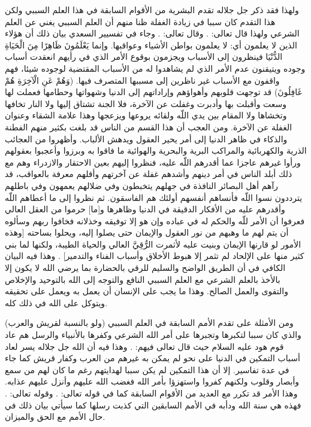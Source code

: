 ولهذا فقد ذكر جل جلاله تقدم البشرية من الأقوام السابقة في هذا العلم السببي ولكن هذا التقدم كان سببا في زيادة الغفلة ظنا منهم أن العلم السببي يغني عن العلم الشرعي ولهذا قال تعالى: 
\quranayah*[40][83]{\footnotesize \surahname*[40]}. وقال تعالى:
\quranayah*[30][7]{\footnotesize \surahname*[30]}. وجاء في تفسيير السعدي بيان ذلك أن هؤلاء الذين لا يعلمون أي: لا يعلمون بواطن الأشياء وعواقبها. وإنما {يَعْلَمُونَ ظَاهِرًا مِنَ الْحَيَاةِ الدُّنْيَا} فينظرون إلى الأسباب ويجزمون بوقوع الأمر الذي في رأيهم انعقدت أسباب وجوده ويتيقنون عدم الأمر الذي لم يشاهدوا له من الأسباب المقتضية لوجوده شيئا، فهم واقفون مع الأسباب غير ناظرين إلى مسببها المتصرف فيها. (وَهُمْ عَنِ الْآخِرَةِ هُمْ غَافِلُونَ) قد توجهت قلوبهم وأهواؤهم وإراداتهم إلى الدنيا وشهواتها وحطامها فعملت لها وسعت وأقبلت بها وأدبرت وغفلت عن الآخرة، فلا الجنة تشتاق إليها ولا النار تخافها وتخشاها ولا المقام بين يدي اللّه ولقائه يروعها ويزعجها وهذا علامة الشقاء وعنوان الغفلة عن الآخرة. ومن العجب أن هذا القسم من الناس قد بلغت بكثير منهم الفطنة والذكاء في ظاهر الدنيا إلى أمر يحير العقول ويدهش الألباب. وأظهروا من العجائب الذرية والكهربائية والمراكب البرية والبحرية والهوائية ما فاقوا به وبرزوا وأعجبوا بعقولهم ورأوا غيرهم عاجزا عما أقدرهم اللّه عليه، فنظروا إليهم بعين الاحتقار والازدراء وهم مع ذلك أبلد الناس في أمر دينهم وأشدهم غفلة عن آخرتهم وأقلهم معرفة بالعواقب، قد رآهم أهل البصائر النافذة في جهلهم يتخبطون وفي ضلالهم يعمهون وفي باطلهم يترددون نسوا اللّه فأنساهم أنفسهم أولئك هم الفاسقون. ثم نظروا إلى ما أعطاهم اللّه وأقدرهم عليه من الأفكار الدقيقة في الدنيا وظاهرها و[ما] حرموا من العقل العالي فعرفوا أن الأمر للّه والحكم له في عباده وإن هو إلا توفيقه وخذلانه فخافوا ربهم وسألوه أن يتم لهم ما وهبهم من نور العقول والإيمان حتى يصلوا إليه، ويحلوا بساحته [وهذه الأمور لو قارنها الإيمان وبنيت عليه لأثمرت الرُّقِيَّ العالي والحياة الطيبة، ولكنها لما بني كثير منها على الإلحاد لم تثمر إلا هبوط الأخلاق وأسباب الفناء والتدمير] \cite{tafsir_Saadi}. وهذا فيه البيان الكافي في أن الطريق الواضح والسليم للرقي بالحضارة بما يرضي الله لا يكون إلا بالأخذ بالعلم الشرعي مع العلم السببي النافع والتوجه إلى الله بالتوحيد والإخلاص والتقوى والعمل الصالح. وهذا ما يجب على الإنسان أن يعمل به ويعمل على تحقيقه ويتوكل على الله في ذلك كله.

ومن الأمثلة على تقدم الأمم السابقة في العلم السببي (ولو بالنسبة لقريش والعرب) والذي كان سببا لتكبرها وتجبرها على أمر الله الشرعي وكفرها بالأنبياء والرسل هم عاد قوم هود عليه السلام حيث قال تعالى فيهم:
\quranayah*[46][26]{\footnotesize \surahname*[46]}. وهذا فيه أن الله جل جلاله يسر لعاد أسباب التمكين في الدنيا على نحو لم يمكن به غيرهم من العرب وكفار قريش كما جاء في عدة تفاسير. إلا أن هذا التمكين لم يكن سببا لهدايتهم رغم ما كان لهم من سمع وأبصار وقلوب ولكنهم كفروا واستهزؤا بأمر الله فغضب الله عليهم وأنزل عليهم عذابه. وهذا الأمر قد تكرر مع العديد من الأقوام السابقة كما في قوله تعالى: \quranayah*[6][6]{\footnotesize \surahname*[6]}. وقوله تعالى: \quranayah*[30][9]{\footnotesize \surahname*[30]}. فهذه هي سنة الله ودأبه في الأمم السابقين التي كذبت رسلها كما سيأتي بيان ذلك في حال الأمم مع الحق والميزان.

